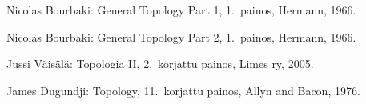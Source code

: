 \documentclass[12pt,a4paper,leqno]{report}
\theoremstyle{plain}
\newtheorem{lause}[equation]{Lause}
\newtheorem{lem}[equation]{Lemma}
\newtheorem{kor}[equation]{Korollaari}
\theoremstyle{definition}
\newtheorem{maar}[equation]{Määritelmä}
\newtheorem{esim}[equation]{Esimerkki}
\theoremstyle{remark}
\newtheorem{huom}[equation]{Huomautus}
\begin{document}
\begin{thebibliography}{9}

Nicolas Bourbaki: General Topology Part 1, 1.\ painos, Hermann, 1966.

Nicolas Bourbaki: General Topology Part 2, 1.\ painos, Hermann, 1966.

%
%
Jussi Väisälä: Topologia II, 2.\ korjattu painos, Limes ry, 2005.

James Dugundji: Topology, 11.\ korjattu painos, Allyn and Bacon, 1976.



\end{thebibliography}
\end{document}
